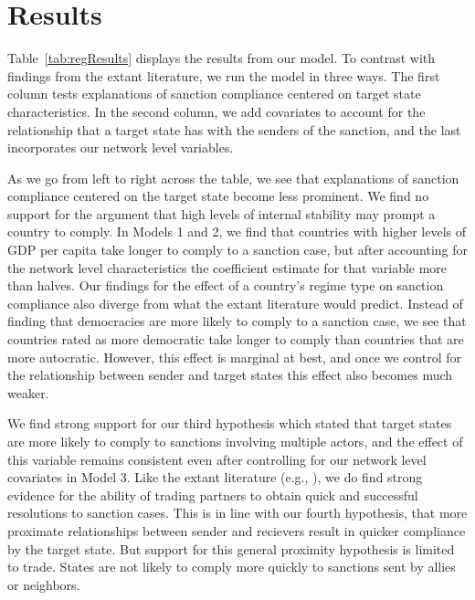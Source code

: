 \section*{Results}
\label{Results} 

Table~\ref{tab:regResults} displays the results from our model. To contrast with findings from the extant literature, we run the model in three ways. The first column tests explanations of sanction compliance centered on target state characteristics. In the second column, we add covariates to account for the relationship that a target state has with the senders of the sanction, and the last incorporates our network level variables. 

As we go from left to right across the table, we see that explanations of sanction compliance centered on the target state become less prominent. We find no support for the argument that high levels of internal stability may prompt a country to comply. In Models 1 and 2, we find that countries with higher levels of GDP per capita take longer to comply to a sanction case, but after accounting for the network level characteristics the coefficient estimate for that variable more than halves. Our findings for the effect of a country's regime type on sanction compliance also diverge from what the extant literature would predict. Instead of finding that democracies are more likely to comply to a sanction case, we see that countries rated as more democratic take longer to comply than countries that are more autocratic. However, this effect is marginal at best, and once we control for the relationship between sender and target states this effect also becomes much weaker. 

We find strong support for our third hypothesis which stated that target states are more likely to comply to sanctions involving multiple actors, and the effect of this variable remains consistent even after controlling for our network level covariates in Model 3. Like the extant literature (e.g., \citealp{mclean2010friends}), we do find strong evidence for the ability of trading partners to obtain quick and successful resolutions to sanction cases. This is in line with our fourth hypothesis, that more proximate relationships between sender and recievers result in quicker compliance by the target state. But support for this general proximity hypothesis is limited to trade. States are not likely to comply more quickly to sanctions sent by allies or neighbors. 


\FloatBarrier

